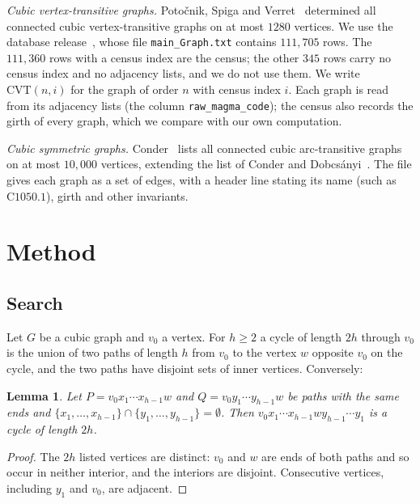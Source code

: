 \documentclass[11pt]{amsart}
\newtheorem{lemma}[theorem]{Lemma}
\theoremstyle{remark}
\newcommand{\code}[1]{\texttt{#1}}
\begin{document}
\emph{Cubic vertex-transitive graphs.} Potočnik, Spiga and Verret~\cite{PSV2013}
determined all connected cubic vertex-transitive graphs on at most $1280$
vertices. We use the database release~\cite{PSVdata}, whose file
\code{main\_Graph.txt} contains $111{,}705$ rows. The $111{,}360$ rows with a
census index are the census; the other $345$ rows carry no census index and
no adjacency lists, and we do not use them. We write $\mathrm{CVT}(n,i)$ for
the graph of order $n$ with census index $i$. Each graph is read from its
adjacency lists (the column \code{raw\_magma\_code}); the census also records
the girth of every graph, which we compare with our own computation.

\emph{Cubic symmetric graphs.} Conder~\cite{ConderList} lists all connected
cubic arc-transitive graphs on at most $10{,}000$ vertices, extending the list
of Conder and Dobcsányi~\cite{ConderDobcsanyi2002}. The file gives each graph as
a set of edges, with a header line stating its name (such as
$\mathrm{C1050.1}$), girth and other invariants.

\section{Method}\label{sec:method}

\subsection{Search}
Let $G$ be a cubic graph and $v_0$ a vertex. For $h\ge 2$ a cycle of length
$2h$ through $v_0$ is the union of two paths of length $h$ from $v_0$ to the
vertex $w$ opposite $v_0$ on the cycle, and the two paths have disjoint sets of
inner vertices. Conversely:

\begin{lemma}\label{lem:mitm}
Let $P=v_0x_1\cdots x_{h-1}w$ and $Q=v_0y_1\cdots y_{h-1}w$ be paths with the same
ends and $\{x_1,\dots,x_{h-1}\}\cap\{y_1,\dots,y_{h-1}\}=\emptyset$. Then
$v_0x_1\cdots x_{h-1}wy_{h-1}\cdots y_1$ is a cycle of length $2h$.
\end{lemma}

\begin{proof}
The $2h$ listed vertices are distinct: $v_0$ and $w$ are ends of both paths and
so occur in neither interior, and the interiors are disjoint. Consecutive
vertices, including $y_1$ and $v_0$, are adjacent.
\end{proof}
\end{document}

